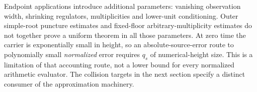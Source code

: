 Endpoint applications introduce additional parameters: vanishing
observation width, shrinking regulators, multiplicities and lower-unit
conditioning. Outer simple-root puncture estimates and fixed-floor
arbitrary-multiplicity estimates do not together prove a uniform theorem
in all those parameters. At zero time the carrier is exponentially small
in height, so an absolute-source-error route to polynomially small
\emph{normalized} error requires $q_s$ of numerical-height size. This
is a limitation of that accounting route, not a lower bound for every
normalized arithmetic evaluator. The collision targets in the next
section specify a distinct consumer of the approximation machinery.
